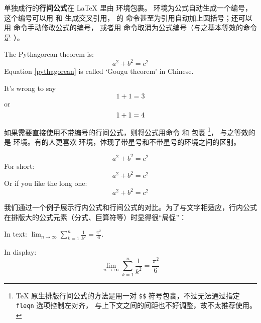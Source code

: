 单独成行的\textbf{行间公式}在 \LaTeX{} 里由  环境包裹。
 环境为公式自动生成一个编号，这个编号可以用  和  生成交叉引用，
 的  命令甚至为引用自动加上圆括号；还可以用  命令手动修改公式的编号，
或者用  命令取消为公式编号（与之基本等效的命令是 ）。

\begin{example}
The Pythagorean theorem is:
\begin{equation}
a^2 + b^2 = c^2 \label{pythagorean}
\end{equation}
Equation \eqref{pythagorean} is
called `Gougu theorem' in Chinese.
\end{example}

\begin{example}
It's wrong to say
\begin{equation}
1 + 1 = 3 \tag{dumb}
\end{equation}
or
\begin{equation}
1 + 1 = 4 \notag
\end{equation}
\end{example}

\cmdindex{[,]}
如果需要直接使用不带编号的行间公式，则将公式用命令 \cmd{[} 和 \cmd{]} 包裹%
\footnote{\TeX{} 原生排版行间公式的方法是用一对 \texttt{\$\$} 符号包裹，不过无法通过指定 \texttt{fleqn} 选项控制左对齐，
与上下文之间的间距也不好调整，故不太推荐使用。}，
与之等效的是  环境。有的人更喜欢  环境，体现了带星号和不带星号的环境之间的区别。

\begin{example}
\begin{equation*}
a^2 + b^2 = c^2
\end{equation*}
For short:
\[ a^2 + b^2 = c^2 \]
Or if you like the long one:
\begin{displaymath}
a^2 + b^2 = c^2
\end{displaymath}
\end{example}

我们通过一个例子展示行内公式和行间公式的对比。为了与文字相适应，行内公式在排版大的公式元素（分式、巨算符等）时显得很“局促”：

\begin{example}
In text:
$\lim_{n \to \infty}
\sum_{k=1}^n \frac{1}{k^2}
= \frac{\pi^2}{6}$.

In display:
\[
\lim_{n \to \infty}
\sum_{k=1}^n \frac{1}{k^2}
= \frac{\pi^2}{6}
\]
\end{example}

